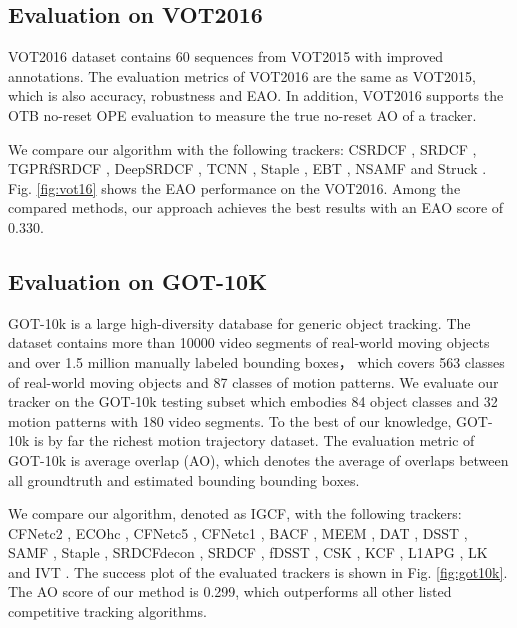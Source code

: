 \documentclass[review]{elsarticle}
\begin{document}
\begin{CJK*}{UTF8}{gbsn}
\subsection{Evaluation on VOT2016}
VOT2016 \cite{Kristan2016TheVO} dataset contains 60 sequences from VOT2015 with improved annotations. The evaluation metrics of VOT2016 are the same as VOT2015, which is also accuracy, robustness and EAO. In addition, VOT2016 supports the OTB no-reset OPE evaluation to measure the true no-reset AO of a tracker.

We compare our algorithm with the following trackers:
CSRDCF \cite{Lukezic2017DiscriminativeCF}, SRDCF \cite{Danelljan2015LearningSR}, TGPRfSRDCF \cite{gao2018tracking}, DeepSRDCF \cite{Danelljan2015ConvolutionalFF}, TCNN \cite{nam2016modeling}, Staple \cite{Bertinetto2016StapleC}, EBT \cite{Zhu2016BeyondLS},  NSAMF \cite{Hua2015OnlineOT} and Struck \cite{Hare2011StruckSO}. Fig. \ref{fig:vot16} shows the EAO performance on the VOT2016. Among the compared methods, our approach achieves the best results with an EAO score of 0.330.

\subsection{Evaluation on GOT-10K}
GOT-10k \cite{Huang2018GOT10kAL} is a large high-diversity database for generic object tracking. The dataset contains more than 10000 video segments of real-world moving objects and over 1.5 million manually labeled bounding boxes， which covers 563 classes of real-world moving objects and 87 classes of motion patterns. We evaluate our tracker on the GOT-10k testing subset which embodies 84 object classes and 32 motion patterns with 180 video segments. To the best of our knowledge, GOT-10k is by far the richest motion trajectory dataset.
The evaluation metric of GOT-10k is average overlap (AO), which  denotes the average of overlaps between all groundtruth and estimated bounding bounding boxes. 

We compare our algorithm, denoted as IGCF, with the following trackers: CFNetc2 \cite{Valmadre2017EndtoEndRL}, ECOhc \cite{Danelljan2017ECOEC}, CFNetc5 \cite{Valmadre2017EndtoEndRL}, CFNetc1 \cite{Valmadre2017EndtoEndRL}, BACF \cite{Galoogahi2017LearningBC}, MEEM \cite{Zhang2014MEEMRT}, DAT \cite{Possegger2015InDO}, DSST \cite{Danelljan2014AccurateSE}, SAMF \cite{Li2014ASA}, Staple \cite{Bertinetto2016StapleC}, SRDCFdecon \cite{Danelljan2016AdaptiveDO}, SRDCF \cite{Danelljan2015LearningSR}, fDSST \cite{Danelljan2017DiscriminativeSS}, CSK \cite{Henriques2012ExploitingTC}, KCF \cite{Henriques2015HighSpeedTW}, L1APG \cite{Bao2012RealTR}, LK \cite{Shi1994GoodFT} and IVT \cite{Ross2007IncrementalLF}. The success plot of the evaluated trackers is shown in Fig. \ref{fig:got10k}.  The AO score of our method is 0.299, which outperforms all other listed competitive tracking algorithms.


\end{CJK*}
\end{document}
